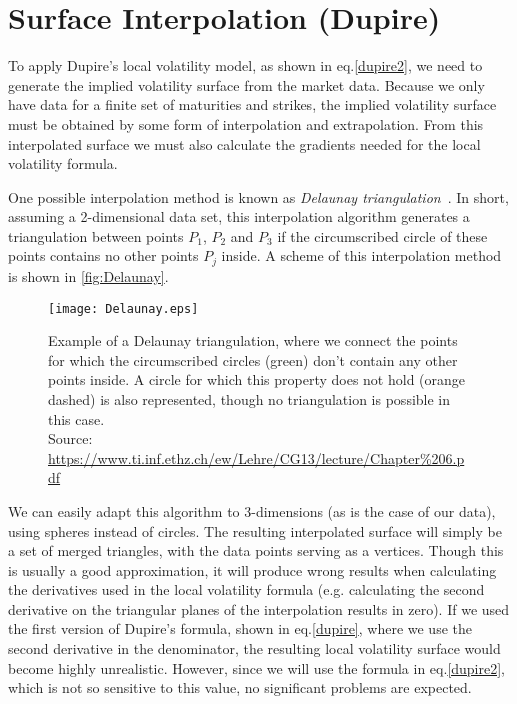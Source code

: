 \section{Surface Interpolation (Dupire)}
\label{section:Surface Interpolation (Dupire)}
To apply Dupire's local volatility model, as shown in eq.\eqref{dupire2}, we need to generate the implied volatility surface from the market data. Because we only have data for a finite set of maturities and strikes, the implied volatility surface must be obtained by some form of interpolation and extrapolation. From this interpolated surface we must also calculate the gradients needed for the local volatility formula.

 
One possible interpolation method is known as \emph{Delaunay triangulation}~\citep{Isaac}. In short, assuming a 2-dimensional data set, this interpolation algorithm generates a triangulation between points $P_1$, $P_2$ and $P_3$ if the circumscribed circle of these points contains no other points $P_j$ inside. A scheme of this interpolation method is shown in \autoref{fig:Delaunay}.

\begin{figure}[!htb]
    \centering
      \texttt{[image: Delaunay.eps]}
      \caption[Example of a Delaunay triangulation, where we connect the points for which the circumscribed circles don't contain any other points inside. A circle for which this property does not hold is also represented, though no triangulation is possible in this case.]{Example of a Delaunay triangulation, where we connect the points for which the circumscribed circles (green) don't contain any other points inside. A circle for which this property does not hold (orange dashed) is also represented, though no triangulation is possible in this case.\\{\small Source: \url{https://www.ti.inf.ethz.ch/ew/Lehre/CG13/lecture/Chapter\%206.pdf}}}\label{fig:Delaunay}
    \end{figure}

 We can easily adapt this algorithm to 3-dimensions (as is the case of our data), using spheres instead of circles.
The resulting interpolated surface will simply be a set of merged triangles, with the data points serving as a vertices. Though this is usually a good approximation, it will produce wrong results when calculating the derivatives used in the local volatility formula (e.g. calculating the second derivative on the triangular planes of the interpolation results in zero). If we used the first version of Dupire's formula, shown in eq.\eqref{dupire}, where we use the second derivative in the denominator, the resulting local volatility surface would become highly unrealistic. However, since we will use the formula in eq.\eqref{dupire2}, which is not so sensitive to this value, no significant problems are expected.

